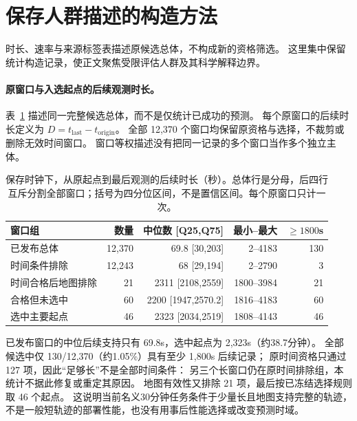 \clearpage

\section{保存人群描述的构造方法}
\label{sec:population-description-construction}\hypertarget{sec:population-description-construction}{}
时长、速率与来源标签表描述原候选总体，不构成新的资格筛选。
这里集中保留统计构造记录，使正文聚焦受限评估人群及其科学解释边界。

\paragraph{原窗口与入选起点的后续观测时长。}\label{sec:final-cohort-durations}\hypertarget{sec:final-cohort-durations}{}
表~\ref{tab:final-cohort-durations} 描述同一完整候选总体，而不是仅统计已成功的预测。
每个原窗口的后续时长定义为 $D=t_{\mathrm{last}}-t_{\mathrm{origin}}$。
全部 12,370 个窗口均保留原资格与选择，不裁剪或删除无效时间窗口。
窗口等权描述没有把同一记录的多个窗口当作多个独立主体。

\begin{table}[htbp]
\centering\small
\caption{保存时钟下，从原起点到最后观测的后续时长（秒）。总体行是分母，后四行互斥分割全部窗口；括号为四分位区间，不是置信区间。每个原窗口只计一次。}
\label{tab:final-cohort-durations}\hypertarget{tab:final-cohort-durations}{}
\begin{tabular}{@{}lrrrr@{}}
\toprule
窗口组 & 数量 & 中位数 [Q25,Q75] & 最小--最大 & $\geq1800$s\\
\midrule
已发布总体 & 12,370 & 69.8 [30,203] & 2--4183 & 130\\
时间条件排除 & 12,243 & 68 [29,194] & 2--2790 & 3\\
时间合格后地图排除 & 21 & 2311 [2108,2559] & 1800--3984 & 21\\
合格但未选中 & 60 & 2200 [1947,2570.2] & 1816--4183 & 60\\
选中主要起点 & 46 & 2323 [2034,2519] & 1808--4143 & 46\\
\bottomrule
\end{tabular}
\end{table}

已发布窗口的中位后续支持只有 69.8s，选中起点为 2,323s（约38.7分钟）。
全部候选中仅 130/12,370（约1.05\%）具有至少 1,800s 后续记录；
原时间资格只通过 127 项，因此“足够长”不是全部时间条件：
另三个长窗口仍在原时间排除组，本统计不据此修复或重定其原因。
地图有效性又排除 21 项，最后按已冻结选择规则取 46 个起点。
这说明当前名义30分钟任务条件于少量长且地图支持完整的轨迹，
不是一般短轨迹的部署性能，也没有用事后性能选择或改变预测时域。

